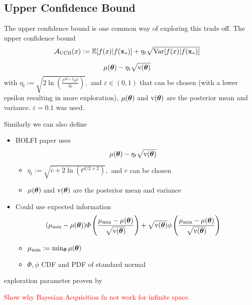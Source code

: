 \subsection*{Upper Confidence Bound}

The upper confidence bound is one common way of exploring this trade off. The
upper confidence bound
$$
    \mathcal{A}_\text{UCB}(x)
    := \operatorname{\mathbb{E}}[f(x) | f(\mathbf{x}_*)]
    + \eta_t \sqrt{\mathrm{Var}[f(x) | f(\mathbf{x}_*)]}
$$


$$\mu(\bm{\theta}) - \eta_t\sqrt{\mathrm{v}(\bm{\theta})}$$
with $\eta_t:= \sqrt{2\ln(\frac{t^{2d + 2}\pi^2}{3\varepsilon})},$ and
$\varepsilon \in (0, 1)$ that can be chosen
(with a lower epsilon resulting in more exploration), $\mu(\bm{\theta})$ and
$\mathrm{v}(\bm{\theta})$ are the posterior mean and variance.
$\varepsilon = 0.1$ was used.


Similarly we can also define

\begin{itemize}
    \item BOLFI paper uses $$\mu(\bm{\theta}) - \eta_t\sqrt{\mathrm{v}(\bm{\theta})}$$ \begin{itemize}
              \item $\eta_t:= \sqrt{c + 2\ln(t^{d/2 + 2})},$ and $c$ can be chosen
              \item $\mu(\bm{\theta})$ and $\mathrm{v}(\bm{\theta})$ are the posterior mean and variance
          \end{itemize}

    \item Could use expected information
          $$
              (\mu_\text{min} - \mu(\bm{\theta})) \varPhi \left(
              \frac{\mu_\text{min} - \mu(\bm{\theta})}{\sqrt{\mathrm{v}(\bm{\theta})}}
              \right)
              + \sqrt{\mathrm{v}(\bm{\theta})}\phi\left(
              \frac{\mu_\text{min} - \mu(\bm{\theta})}{\sqrt{\mathrm{v}(\bm{\theta})}}
              \right)
          $$
          \begin{itemize}
              \item $\mu_\text{min} := \min_{\bm{\theta}} \mu(\bm{\theta})$
              \item $\varPhi, \phi$ CDF and PDF of standard normal
          \end{itemize}
\end{itemize}
exploration parameter proven by \cite{srinivas_gaussian_2010}

\textcolor{red}{Show why Bayesian Acquisition fn not work for infinite space.}